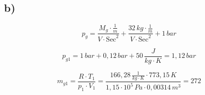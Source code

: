 

\subsection*{b)}
\[
p_{g} = \frac{M_{g} \cdot \frac{1}{m}}{V \cdot \text{Sec}^2} + \frac{32 \, kg \cdot \frac{1}{m}}{V \cdot \text{Sec}^2} + 1 \, bar
\]

\[
p_{g1} = 1 \, bar + 0,12 \, bar + 50 \, \frac{J}{kg \cdot K} = 1,12 \, bar
\]

\[
m_{g1} = \frac{R \cdot T_1}{p_1 \cdot V_1} = \frac{166,28 \, \frac{1}{kg \cdot K} \cdot 773,15 \, K}{1,15 \cdot 10^5 \, Pa \cdot 0,00314 \, m^3} = 272
\]
